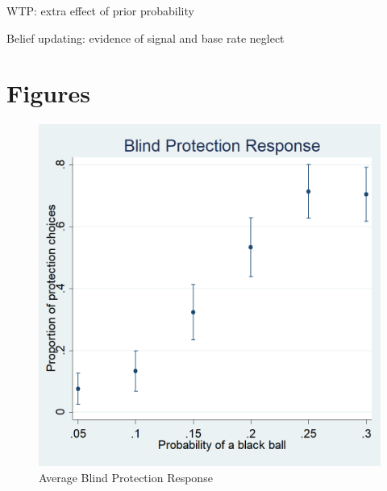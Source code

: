 \documentclass[11pt,a4paper]{article}
\begin{document}
\begin{table}
\caption{WTP: extra effect of prior probability}

\end{table}


%
%
\begin{table}
\caption{Belief updating: evidence of signal and base rate neglect}

\end{table}




%

%

%

%


%
\vspace{40pt}
\newpage

\newpage

\section{Figures}

\begin{figure}[H]
\centering
\caption{Average Blind Protection Response} \label{Blind Protection Responses}

  \centering
  \includegraphics[scale=0.3]{Graphs/blind_prot_sta.png}

\end{figure}
\end{document}
